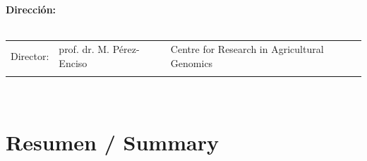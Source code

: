 \documentclass[11pt,spanish,a4paper,oneside,]{book} %
\begin{document}
\clearpage
\thispagestyle{empty}
\noindent\textbf{Dirección:}\\
\\
\noindent\begin{tabular}{@{}lll}

Director:
&  prof. dr. M. Pérez-Enciso & Centre for Research in Agricultural Genomics\\

\\
\end{tabular}\\



{
\hypersetup{linkcolor=black}
\setcounter{tocdepth}{1}
\tableofcontents
}
\mainmatter
\hypertarget{resumen-summary}{%
\chapter{Resumen / Summary}\label{resumen-summary}}
\end{document}
